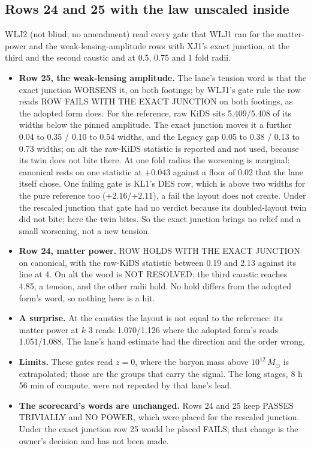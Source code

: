 \documentclass[10pt]{article}
\begin{document}
\subsection{Rows 24 and 25 with the law unscaled inside}
WLJ2 (not blind; no amendment) read every gate that WLJ1 ran for the matter-power and the weak-lensing-amplitude rows with XJ1's exact junction, at the third and the second caustic and at 0.5, 0.75 and 1 fold radii.
\begin{itemize}
\item \textbf{Row 25, the weak-lensing amplitude.} The lane's tension word is that the exact junction WORSENS it, on both footings; by WLJ1's gate rule the row reads ROW FAILS WITH THE EXACT JUNCTION on both footings, as the adopted form does. For the reference, raw KiDS sits 5.409/5.408 of its widths below the pinned amplitude. The exact junction moves it a further 0.04 to 0.35 / 0.10 to 0.54 widths, and the Legacy gap 0.05 to 0.38 / 0.13 to 0.73 widths; on alt the raw-KiDS statistic is reported and not used, because its twin does not bite there. At one fold radius the worsening is marginal: canonical rests on one statistic at $+0.043$ against a floor of 0.02 that the lane itself chose. One failing gate is KL1's DES row, which is above two widths for the pure reference too ($+2.16$/$+2.11$), a fail the layout does not create. Under the rescaled junction that gate had no verdict because its doubled-layout twin did not bite; here the twin bites. So the exact junction brings no relief and a small worsening, not a new tension.
\item \textbf{Row 24, matter power.} ROW HOLDS WITH THE EXACT JUNCTION on canonical, with the raw-KiDS statistic between 0.19 and 2.13 against its line at 4. On alt the word is NOT RESOLVED: the third caustic reaches 4.85, a tension, and the other radii hold. No hold differs from the adopted form's word, so nothing here is a hit.
\item \textbf{A surprise.} At the caustics the layout is not equal to the reference: its matter power at $k$ 3 reads 1.070/1.126 where the adopted form's reads 1.051/1.088. The lane's hand estimate had the direction and the order wrong.
\item \textbf{Limits.} These gates read $z=0$, where the baryon mass above $10^{12}\,M_\odot$ is extrapolated; those are the groups that carry the signal. The long stages, 8 h 56 min of compute, were not repeated by that lane's lead.
\item \textbf{The scorecard's words are unchanged.} Rows 24 and 25 keep PASSES TRIVIALLY and NO POWER, which were placed for the rescaled junction. Under the exact junction row 25 would be placed FAILS; that change is the owner's decision and has not been made.
\end{itemize}
\end{document}

